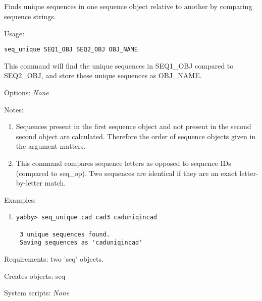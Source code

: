 

\subsection[seq\_unique]{  }



Finds unique sequences in one sequence object relative to another
by comparing sequence strings.


\begin{description}


\item{Usage:}

{\tt seq\_unique SEQ1\_OBJ SEQ2\_OBJ OBJ\_NAME}

This command will find the unique sequences in SEQ1\_OBJ compared
to SEQ2\_OBJ, and store these unique sequences as OBJ\_NAME.


\item{Options:} {\em None}


\item{Notes:}
\begin{enumerate}
\item Sequences present in the first sequence object and not present
 in the second second object are calculated. Therefore the order
 of sequence objects given in the argument matters.
\item This command compares sequence letters as opposed to sequence
 IDs (compared to seq\_op). Two sequences are identical if they
 are an exact letter-by-letter match.
\end{enumerate}


\item{Examples:}
\begin{enumerate}

\item
\begin{verbatim}
yabby> seq_unique cad cad3 caduniqincad

 3 unique sequences found.
 Saving sequences as 'caduniqincad'

\end{verbatim}

\end{enumerate}


\item{Requirements:} two 'seq' objects.


\item{Creates objects:} seq


\item{System scripts:} {\em None}

\end{description}

